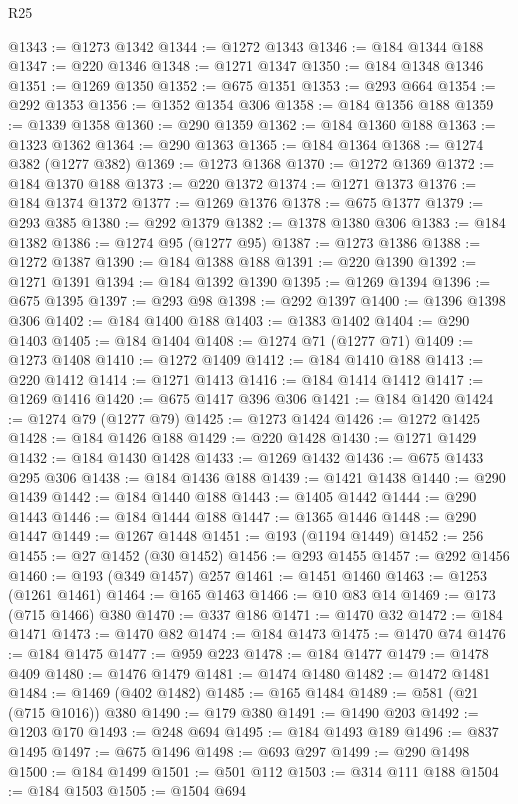 \begin{lexlean}{R25}
\begin{coremodule}
@1343 := @1273 @1342
@1344 := @1272 @1343
@1346 := @184 @1344 @188
@1347 := @220 @1346
@1348 := @1271 @1347
@1350 := @184 @1348 @1346
@1351 := @1269 @1350
@1352 := @675 @1351
@1353 := @293 @664
@1354 := @292 @1353
@1356 := @1352 @1354 @306
@1358 := @184 @1356 @188
@1359 := @1339 @1358
@1360 := @290 @1359
@1362 := @184 @1360 @188
@1363 := @1323 @1362
@1364 := @290 @1363
@1365 := @184 @1364
@1368 := @1274 @382 (@1277 @382)
@1369 := @1273 @1368
@1370 := @1272 @1369
@1372 := @184 @1370 @188
@1373 := @220 @1372
@1374 := @1271 @1373
@1376 := @184 @1374 @1372
@1377 := @1269 @1376
@1378 := @675 @1377
@1379 := @293 @385
@1380 := @292 @1379
@1382 := @1378 @1380 @306
@1383 := @184 @1382
@1386 := @1274 @95 (@1277 @95)
@1387 := @1273 @1386
@1388 := @1272 @1387
@1390 := @184 @1388 @188
@1391 := @220 @1390
@1392 := @1271 @1391
@1394 := @184 @1392 @1390
@1395 := @1269 @1394
@1396 := @675 @1395
@1397 := @293 @98
@1398 := @292 @1397
@1400 := @1396 @1398 @306
@1402 := @184 @1400 @188
@1403 := @1383 @1402
@1404 := @290 @1403
@1405 := @184 @1404
@1408 := @1274 @71 (@1277 @71)
@1409 := @1273 @1408
@1410 := @1272 @1409
@1412 := @184 @1410 @188
@1413 := @220 @1412
@1414 := @1271 @1413
@1416 := @184 @1414 @1412
@1417 := @1269 @1416
@1420 := @675 @1417 @396 @306
@1421 := @184 @1420
@1424 := @1274 @79 (@1277 @79)
@1425 := @1273 @1424
@1426 := @1272 @1425
@1428 := @184 @1426 @188
@1429 := @220 @1428
@1430 := @1271 @1429
@1432 := @184 @1430 @1428
@1433 := @1269 @1432
@1436 := @675 @1433 @295 @306
@1438 := @184 @1436 @188
@1439 := @1421 @1438
@1440 := @290 @1439
@1442 := @184 @1440 @188
@1443 := @1405 @1442
@1444 := @290 @1443
@1446 := @184 @1444 @188
@1447 := @1365 @1446
@1448 := @290 @1447
@1449 := @1267 @1448
@1451 := @193 (@1194 @1449)
@1452 := 256
@1455 := @27 @1452 (@30 @1452)
@1456 := @293 @1455
@1457 := @292 @1456
@1460 := @193 (@349 @1457) @257
@1461 := @1451 @1460
@1463 := @1253 (@1261 @1461)
@1464 := @165 @1463
@1466 := @10 @83 @14
@1469 := @173 (@715 @1466) @380
@1470 := @337 @186
@1471 := @1470 @32
@1472 := @184 @1471
@1473 := @1470 @82
@1474 := @184 @1473
@1475 := @1470 @74
@1476 := @184 @1475
@1477 := @959 @223
@1478 := @184 @1477
@1479 := @1478 @409
@1480 := @1476 @1479
@1481 := @1474 @1480
@1482 := @1472 @1481
@1484 := @1469 (@402 @1482)
@1485 := @165 @1484
@1489 := @581 (@21 (@715 @1016)) @380
@1490 := @179 @380
@1491 := @1490 @203
@1492 := @1203 @170
@1493 := @248 @694
@1495 := @184 @1493 @189
@1496 := @837 @1495
@1497 := @675 @1496
@1498 := @693 @297
@1499 := @290 @1498
@1500 := @184 @1499
@1501 := @501 @112
@1503 := @314 @111 @188
@1504 := @184 @1503
@1505 := @1504 @694

\end{coremodule}
\end{lexlean}
